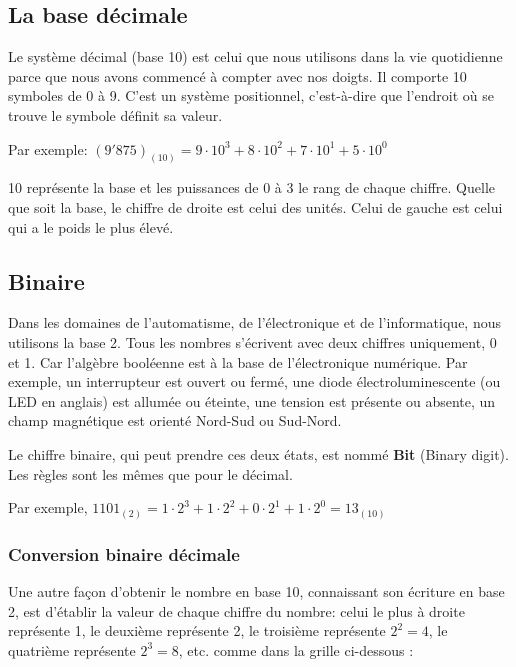 \documentclass[11pt, a4paper]{book}
\begin{document}
\subsection{La base décimale}

Le système décimal (base 10) est celui que nous utilisons dans la vie quotidienne parce que nous avons commencé à compter avec nos doigts. Il comporte 10 symboles de 0 à 9. C'est un système positionnel, c'est-à-dire que l'endroit où se trouve le symbole définit sa valeur.

Par exemple: $(9'875)_{(10)}=9 \cdot 10^3 + 8 \cdot 10^2 + 7\cdot 10^1 + 5 \cdot 10^0$

10 représente la base et les puissances de 0 à 3 le rang de chaque chiffre. Quelle que soit la base, le chiffre de droite est celui des unités. Celui de gauche est celui qui a le poids le plus élevé.

\subsection{Binaire}

Dans les domaines de l'automatisme, de l'électronique et de l'informatique, nous utilisons la base 2. Tous les nombres s'écrivent avec deux chiffres uniquement, 0 et 1.  Car l'algèbre booléenne est à la base de l'électronique numérique. Par exemple, un interrupteur est ouvert ou fermé, une diode électroluminescente (ou LED en anglais) est allumée ou éteinte,  une tension est présente ou absente, un champ magnétique est orienté Nord-Sud ou Sud-Nord.

Le chiffre binaire, qui peut prendre ces deux états, est nommé {\bf Bit} (Binary digit). Les règles sont les mêmes que pour le décimal. 

Par exemple, $1101_{(2)}=1 \cdot 2^3 + 1 \cdot 2^2 + 0 \cdot 2^1 + 1\cdot 2^0=13_{(10)}$ 

\subsubsection{Conversion binaire décimale}

Une autre façon d'obtenir le nombre en base 10, connaissant son écriture en base 2, est d'établir la valeur de chaque chiffre du nombre: celui le plus à droite représente 1, le deuxième représente 2, le troisième représente $2^2=4$, le quatrième représente $2^3=8$, etc. comme dans la grille ci-dessous :  

\begin{center}
\end{center} 
\end{document}

